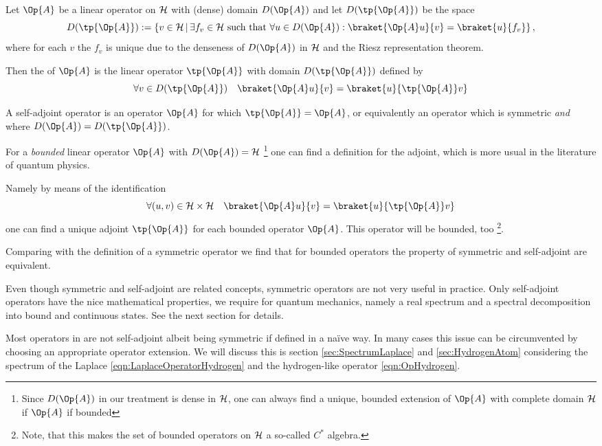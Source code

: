\begin{defn}
	Let $\Op{A}$ be a linear operator on $\mathcal{H}$ with (dense) domain $D(\Op{A})$
	and let $D(\tp{\Op{A}})$ be the space
	\[ D(\tp{\Op{A}}) := \left\{ v \in \hilbert \, \middle| \,
		\exists f_v \in \hilbert \ \text{such that} \
		\forall u \in D(\Op{A}): \braket{\Op{A} u}{v} = \braket{u}{f_v} \right\},
	\]
	where for each $v$ the $f_v$ is unique due to the denseness
	of $D(\Op{A})$ in $\mathcal{H}$ and the Riesz representation theorem.

	Then the  of $\Op{A}$
	is the linear operator $\tp{\Op{A}}$ with domain $D(\tp{\Op{A}})$
	defined by
	\[ \forall v \in D(\tp{\Op{A}}) \quad \braket{\Op{A} u}{v} = \braket{u}{\tp{\Op{A}} v} \]
\end{defn}

\begin{defn}
	A self-adjoint operator is an operator $\Op{A}$ for which $\tp{\Op{A}} = \Op{A}$,
	or equivalently an operator which is symmetric \emph{and} where
	$D(\Op{A}) = D(\tp{\Op{A}})$.
\end{defn}

\begin{rem}
	For a \emph{bounded} linear operator $\Op{A}$ with $D(\Op{A}) = \hilbert$%
	\footnote{Since $D(\Op{A})$ in our treatment is dense in $\mathcal{H}$,
	one can always find a unique, bounded extension of $\Op{A}$ with complete
	domain $\mathcal{H}$ if $\Op{A}$ if bounded}
	one can find a definition for the adjoint,
	which is more usual in the literature of quantum physics.

	\noindent
	Namely by means of the identification
	\[ \forall (u,v) \in \hilbert \times \hilbert \quad \braket{\Op{A} u}{v} = \braket{u}{\tp{\Op{A}} v} \]
	one can find a unique adjoint $\tp{\Op{A}}$ for each bounded operator $\Op{A}$.
	This operator will be bounded, too%
	\footnote{Note, that this makes the set of bounded operators on $\mathcal{H}$
	a so-called $C^\ast$ algebra.}.

	Comparing with the definition of a symmetric operator we find that for
	bounded operators the property of symmetric and self-adjoint are equivalent.
\end{rem}

\begin{rem}
	Even though symmetric and self-adjoint are related concepts,
	symmetric operators are not very useful in practice.
	Only self-adjoint operators have the nice mathematical properties,
	we require for quantum mechanics, namely a real spectrum
	and a spectral decomposition into bound and continuous states.
	See the next section for details.

	Most operators in \QM are not self-adjoint albeit being symmetric
	if defined in a na\"{i}ve way.
	In many cases this issue can be circumvented
	by choosing an appropriate operator extension.
	We will discuss this 
	is section \vref{sec:SpectrumLaplace} and \vref{sec:HydrogenAtom}
	considering the spectrum of the Laplace \eqref{eqn:LaplaceOperatorHydrogen}
	and the hydrogen-like operator \eqref{eqn:OpHydrogen}.
\end{rem}

